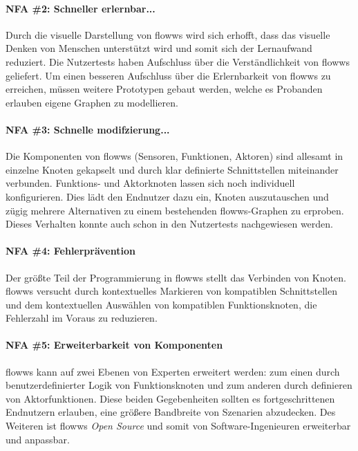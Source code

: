 \paragraph{NFA \#2: Schneller erlernbar...} Durch die visuelle Darstellung von flowws wird sich erhofft, dass das visuelle Denken von Menschen unterstützt wird und somit sich der Lernaufwand reduziert. Die Nutzertests haben Aufschluss über die Verständlichkeit von flowws geliefert. Um einen besseren Aufschluss über die Erlernbarkeit von flowws zu erreichen, müssen weitere Prototypen gebaut werden, welche es Probanden erlauben eigene Graphen zu modellieren.

\paragraph{NFA \#3: Schnelle modifzierung...} Die Komponenten von flowws (Sensoren, Funktionen, Aktoren) sind allesamt in einzelne Knoten gekapselt und durch klar definierte Schnittstellen miteinander verbunden. Funktions- und Aktorknoten lassen sich noch individuell konfigurieren. Dies lädt den Endnutzer dazu ein, Knoten auszutauschen und zügig mehrere Alternativen zu einem bestehenden flowws-Graphen zu erproben. Dieses Verhalten konnte auch schon in den Nutzertests nachgewiesen werden.

\paragraph{NFA \#4: Fehlerprävention} Der größte Teil der Programmierung in flowws stellt das Verbinden von Knoten. flowws versucht durch kontextuelles Markieren von kompatiblen Schnittstellen und dem kontextuellen Auswählen von kompatiblen Funktionsknoten, die Fehlerzahl im Voraus zu reduzieren. 

\paragraph{NFA \#5: Erweiterbarkeit von Komponenten} flowws kann auf zwei Ebenen von Experten erweitert werden: zum einen durch benutzerdefinierter Logik von Funktionsknoten und zum anderen durch definieren von Aktorfunktionen. Diese beiden Gegebenheiten sollten es fortgeschrittenen Endnutzern erlauben, eine größere Bandbreite von Szenarien abzudecken. Des Weiteren ist flowws \textit{Open Source} und somit von Software-Ingenieuren erweiterbar und anpassbar.





